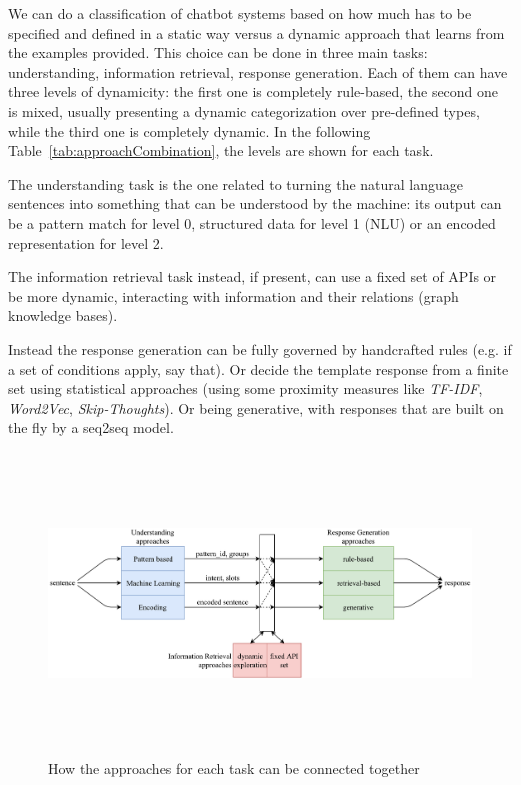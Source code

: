 We can do a classification of chatbot systems based on how much has to be specified and defined in a static way versus a dynamic approach that learns from the examples provided. This choice can be done in three main tasks: understanding, information retrieval, response generation. Each of them can have three levels of dynamicity: the first one is completely rule-based, the second one is mixed, usually presenting a dynamic categorization over pre-defined types, while the third one is completely dynamic. In the following Table~\ref{tab:approachCombination}, the levels are shown for each task.




The understanding task is the one related to turning the natural language sentences into something that can be understood by the machine: its output can be a pattern match for level 0, structured data for level 1 (NLU) or an encoded representation for level 2. 

The information retrieval task instead, if present, can use a fixed set of APIs or be more dynamic, interacting with information and their relations (graph knowledge bases).

Instead the response generation can be fully governed by handcrafted rules (e.g. if a set of conditions apply, say that). Or decide the template response from a finite set using statistical approaches (using some proximity measures like \textit{TF-IDF}, \textit{Word2Vec}, \textit{Skip-Thoughts}). Or being generative, with responses that are built on the fly by a seq2seq model.


\begin{figure}[!htbp]
    \centering
    \includegraphics[max width=\linewidth,max height=8cm,keepaspectratio]{figures/approachesCombination}
    \caption{How the approaches for each task can be connected together}\label{fig:approachesCombination}
\end{figure}

